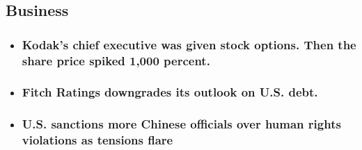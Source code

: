 \begin{itemize}
  \hypertarget{business}{%
  \subsection{Business}\label{business}}

  \begin{itemize}
  \item
    \href{https://www.nytimes3xbfgragh.onion/live/2020/07/31/business/stock-market-today-coronavirus?type=styln-live-updates\&label=business\&index=1\#kodaks-chief-executive-was-given-stock-options-then-the-share-price-spiked-1000-percent}{}

    \hypertarget{kodaks-chief-executive-was-given-stock-options-then-the-share-price-spiked-1000-percent}{%
    \subsubsection{Kodak's chief executive was given stock options. Then
    the share price spiked 1,000
    percent.}\label{kodaks-chief-executive-was-given-stock-options-then-the-share-price-spiked-1000-percent}}
  \item
    \href{https://www.nytimes3xbfgragh.onion/live/2020/07/31/business/stock-market-today-coronavirus?type=styln-live-updates\&label=business\&index=1\#fitch-ratings-downgrades-its-outlook-on-us-debt}{}

    \hypertarget{fitch-ratings-downgrades-its-outlook-on-us-debt}{%
    \subsubsection{Fitch Ratings downgrades its outlook on U.S.
    debt.}\label{fitch-ratings-downgrades-its-outlook-on-us-debt}}
  \item
    \href{https://www.nytimes3xbfgragh.onion/live/2020/07/31/business/stock-market-today-coronavirus?type=styln-live-updates\&label=business\&index=1\#us-sanctions-more-chinese-officials-over-human-rights-violations-as-tensions-flare}{}

    \hypertarget{us-sanctions-more-chinese-officials-over-human-rights-violations-as-tensions-flare}{%
    \subsubsection{U.S. sanctions more Chinese officials over human
    rights violations as tensions
    flare}\label{us-sanctions-more-chinese-officials-over-human-rights-violations-as-tensions-flare}}
  \end{itemize}
\end{itemize}

